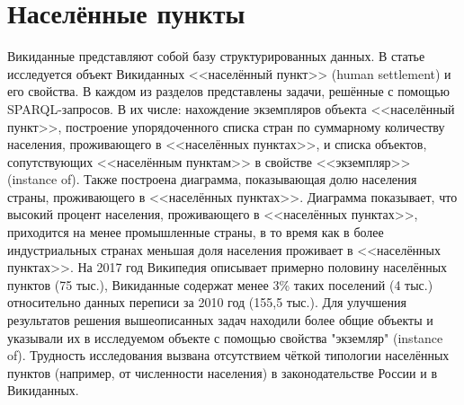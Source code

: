 \chapter{Населённые пункты}
\label{ch:human-settlement}

	Викиданные представляют собой базу структурированных данных. В статье исследуется объект Викиданных <<населённый пункт>> (human settlement) и его свойства. В каждом из разделов представлены задачи, решённые с помощью SPARQL-запросов. В их числе: нахождение экземпляров объекта <<населённый пункт>>, построение упорядоченного списка стран по суммарному количеству населения, проживающего в <<населённых пунктах>>, и списка объектов, сопутствующих <<населённым пунктам>> в свойстве <<экземпляр>> (instance of). Также построена диаграмма, показывающая долю населения страны, проживающего в <<населённых пунктах>>. Диаграмма показывает, что высокий процент населения, проживающего в <<населённых пунктах>>, приходится на менее промышленные страны, в то время как в более индустриальных странах меньшая доля населения проживает в <<населённых пунктах>>. На 2017 год Википедия описывает примерно половину населённых пунктов (75 тыс.), Викиданные содержат менее 3\% таких поселений (4 тыс.) относительно данных переписи за 2010 год (155,5 тыс.). Для улучшения результатов решения вышеописанных задач находили более общие объекты и указывали их в исследуемом объекте с помощью свойства "экземляр" (instance of). Трудность исследования вызвана отсутствием чёткой типологии населённых пунктов (например, от численности населения) в законодательстве России и в Викиданных.




